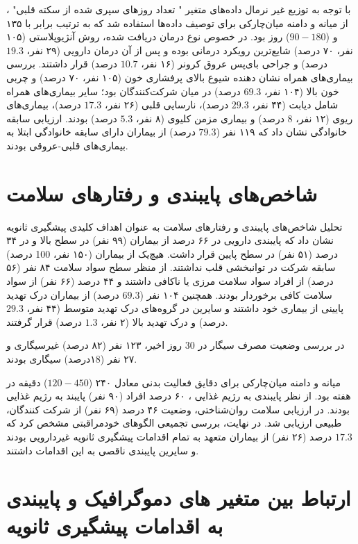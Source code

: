 با توجه به توزیع غیر نرمال داده‌های متغیر " تعداد روزهای سپری شده از سکته قلبی" ، از میانه و دامنه میان‌چارکی برای توصیف داده‌ها استفاده شد که به ترتیب برابر با ۱۳۵ و ($90-180$) روز بود. در خصوص نوع درمان دریافت‌ شده، روش آنژیوپلاستی (۱۰۵ نفر، ۷۰ درصد) شایع‌ترین رویکرد درمانی بوده و پس از آن درمان دارویی (۲۹ نفر، $19.3$ درصد) و جراحی بای‌پس عروق کرونر (۱۶ نفر، $10.7$ درصد) قرار داشتند. بررسی بیماری‌های همراه نشان دهنده شیوع بالای پرفشاری خون (۱۰۵ نفر، ۷۰ درصد) و چربی خون بالا (۱۰۴ نفر، $69.3$ درصد) در میان شرکت‌کنندگان بود؛ سایر بیماری‌های همراه شامل دیابت (۴۴ نفر، $29.3$ درصد)، نارسایی قلبی (۲۶ نفر، $17.3$ درصد)، بیماری‌های ریوی (۱۲ نفر، 8 درصد) و بیماری مزمن کلیوی (۸ نفر، $5.3$ درصد) بودند. ارزیابی سابقه خانوادگی نشان داد که ۱۱۹ نفر ($79.3$ درصد) از بیماران دارای سابقه خانوادگی ابتلا به بیماری‌های قلبی-عروقی بودند.

\section{شاخص‌های پایبندی و رفتارهای سلامت}


تحلیل شاخص‌های پایبندی و رفتارهای سلامت به‌ عنوان اهداف کلیدی پیشگیری ثانویه نشان داد که پایبندی دارویی در ۶۶ درصد از بیماران (۹۹ نفر) در سطح بالا و در ۳۴ درصد (۵۱ نفر) در سطح پایین قرار داشت. هیچ‌یک از بیماران (۱۵۰ نفر، 100 درصد) سابقه شرکت در توانبخشی قلب نداشتند. از منظر سطح سواد سلامت ۸۴ نفر (۵۶ درصد) از افراد سواد سلامت مرزی یا ناکافی داشتند و ۴۴ درصد (۶۶ نفر) از سواد سلامت کافی برخوردار بودند. همچنین ۱۰۴ نفر ($69.3$ درصد) از بیماران درک تهدید پایینی از بیماری خود داشتند و سایرین در گروه‌های درک تهدید متوسط (۴۴ نفر، $29.3$ درصد) و درک تهدید بالا (۲ نفر، $1.3$ درصد) قرار گرفتند.

در بررسی وضعیت مصرف سیگار در 30 روز اخیر، ۱۲۳ نفر (۸۲ درصد) غیرسیگاری و ۲۷ نفر (۱8درصد) سیگاری بودند.

میانه و دامنه میان‌چارکی برای دقایق فعالیت بدنی معادل ۲۴۰ ($120-450$) دقیقه در هفته بود. از نظر پایبندی به رژیم غذایی ، ۶۰ درصد افراد (۹۰ نفر) پایبند به رژیم غذایی بودند. در ارزیابی سلامت روان‌شناختی، وضعیت ۴۶ درصد (۶۹ نفر) از شرکت کنندگان، طبیعی ارزیابی شد. در نهایت، بررسی تجمیعی الگوهای خودمراقبتی مشخص کرد که $17.3$ درصد (۲۶ نفر) از بیماران متعهد به تمام اقدامات پیشگیری ثانویه غیردارویی بودند و سایرین پایبندی ناقصی به این اقدامات داشتند.



\section{ارتباط بین متغیر های دموگرافیک و پایبندی به اقدامات پیشگیری ثانویه}

